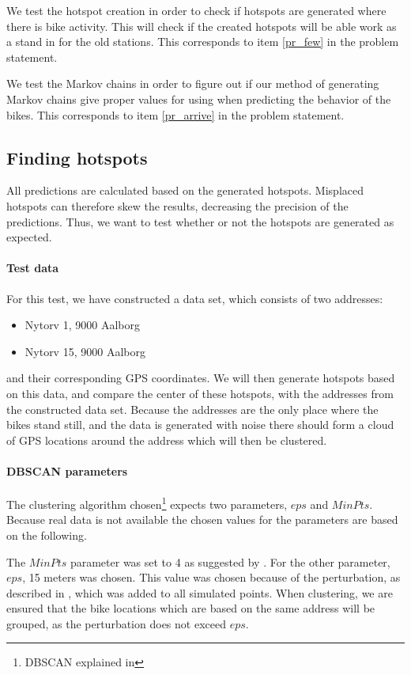 We test the hotspot creation in order to check if hotspots are generated where there is bike activity. 
This will check if the created hotspots will be able work as a stand in for the old stations.
This corresponds to item \ref{pr_few} in the problem statement.

We test the Markov chains in order to figure out if our method of generating Markov chains give proper values for using when predicting the behavior of the bikes.
This corresponds to item \ref{pr_arrive} in the problem statement.

\subsection{Finding hotspots}
All predictions are calculated based on the generated hotspots.
Misplaced hotspots can therefore skew the results, decreasing the precision of the predictions.
Thus, we want to test whether or not the hotspots are generated as expected.

\paragraph{Test data}
For this test, we have constructed a data set, which consists of two addresses:
\begin{itemize}
\item Nytorv 1, 9000 Aalborg
\item Nytorv 15, 9000 Aalborg
\end{itemize}
and their corresponding GPS coordinates.
We will then generate hotspots based on this data, and compare the center of these hotspots, with the addresses from the constructed data set.
Because the addresses are the only place where the bikes stand still, and the data is generated with noise there should form a cloud of GPS locations around the address which will then be clustered.


\paragraph{DBSCAN parameters}
The clustering algorithm chosen\footnote{DBSCAN explained in } expects two parameters, $eps$ and $MinPts$.
Because real data is not available the chosen values for the parameters are based on the following.

The $MinPts$ parameter was set to 4 as suggested by \citet[Page 529]{pang2006introduction}.
For the other parameter, $eps$, 15 meters was chosen.
This value was chosen because of the perturbation, as described in , which was added to all simulated points.
When clustering, we are ensured that the bike locations which are based on the same address will be grouped, as the perturbation does not exceed $eps$.

